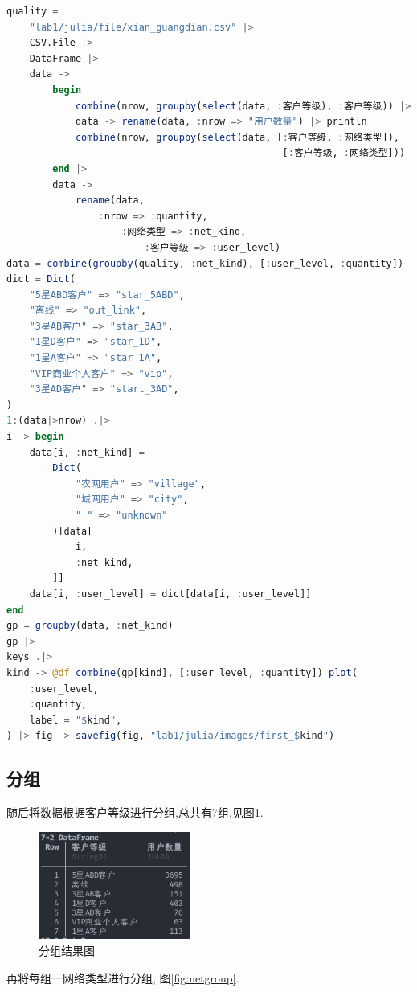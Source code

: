 \documentclass[a4paper]{article}
\begin{document}
\begin{lstlisting}[language=julia]
quality =
    "lab1/julia/file/xian_guangdian.csv" |>
    CSV.File |>
    DataFrame |>
    data ->
        begin
            combine(nrow, groupby(select(data, :客户等级), :客户等级)) |>
            data -> rename(data, :nrow => "用户数量") |> println
            combine(nrow, groupby(select(data, [:客户等级, :网络类型]), 
                                                [:客户等级, :网络类型]))
        end |>
        data ->
            rename(data, 
                :nrow => :quantity, 
                    :网络类型 => :net_kind, 
                        :客户等级 => :user_level)
data = combine(groupby(quality, :net_kind), [:user_level, :quantity])
dict = Dict(
    "5星ABD客户" => "star_5ABD",
    "离线" => "out_link",
    "3星AB客户" => "star_3AB",
    "1星D客户" => "star_1D",
    "1星A客户" => "star_1A",
    "VIP商业个人客户" => "vip",
    "3星AD客户" => "start_3AD",
)
1:(data|>nrow) .|>
i -> begin
    data[i, :net_kind] =
        Dict(
            "农网用户" => "village", 
            "城网用户" => "city",
            " " => "unknown"
        )[data[
            i,
            :net_kind,
        ]]
    data[i, :user_level] = dict[data[i, :user_level]]
end
gp = groupby(data, :net_kind)
gp |>
keys .|>
kind -> @df combine(gp[kind], [:user_level, :quantity]) plot(
    :user_level,
    :quantity,
    label = "$kind",
) |> fig -> savefig(fig, "lab1/julia/images/first_$kind")
\end{lstlisting}

\subsection{分组} \label{sub:group-1}

随后将数据根据客户等级进行分组,总共有7组,见图\ref{fig:customgroup}. 
\begin{figure}[ht]
 \centering
 \includegraphics[width=5cm]{images/广电客户.png}
 \caption{分组结果图}
 \label{fig:customgroup}
\end{figure}

再将每组一网络类型进行分组, 图\ref{fig:netgroup}. 
\end{document}
